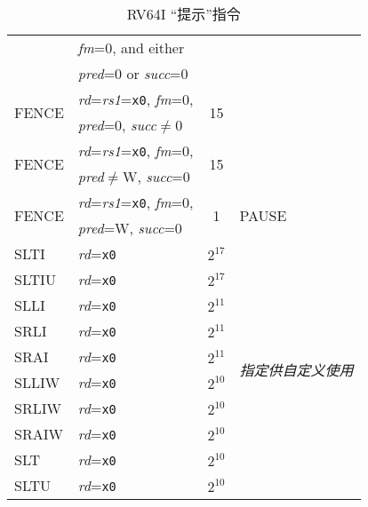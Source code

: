 \begin{table}[hbt]
\begin{tabular}{|l|l|c|l|}
                        & {\em fm}=0, and either                      &                             & \\
                        & {\em pred}=0 or {\em succ}=0                &                             & \\ \cline{1-3}
  \multirow{2}{*}{FENCE}& {\em rd}={\em rs1}={\tt x0}, {\em fm}=0,    & \multirow{2}{*}{15}         & \\
                        & {\em pred}=0, {\em succ}$\neq$0             &                             & \\ \cline{1-3}
  \multirow{2}{*}{FENCE}& {\em rd}={\em rs1}={\tt x0}, {\em fm}=0,    & \multirow{2}{*}{15}         & \\
                        & {\em pred}$\neq$W, {\em succ}=0             &                             & \\ \hline
  \multirow{2}{*}{FENCE}& {\em rd}={\em rs1}={\tt x0}, {\em fm}=0,    & \multirow{2}{*}{1}          & \multirow{2}{*}{PAUSE} \\
                        & {\em pred}=W, {\em succ}=0                  &                             & \\ \hline
  SLTI                  & {\em rd}={\tt x0}                           & $2^{17}$                    & \multirow{10}{*}{\em 指定供自定义使用} \\ \cline{1-3}
  SLTIU                 & {\em rd}={\tt x0}                           & $2^{17}$                    & \\ \cline{1-3}
  SLLI                  & {\em rd}={\tt x0}                           & $2^{11}$                    & \\ \cline{1-3}
  SRLI                  & {\em rd}={\tt x0}                           & $2^{11}$                    & \\ \cline{1-3}
  SRAI                  & {\em rd}={\tt x0}                           & $2^{11}$                    & \\ \cline{1-3}
  SLLIW                 & {\em rd}={\tt x0}                           & $2^{10}$                    & \\ \cline{1-3}
  SRLIW                 & {\em rd}={\tt x0}                           & $2^{10}$                    & \\ \cline{1-3}
  SRAIW                 & {\em rd}={\tt x0}                           & $2^{10}$                    & \\ \cline{1-3}
  SLT                   & {\em rd}={\tt x0}                           & $2^{10}$                    & \\ \cline{1-3}
  SLTU                  & {\em rd}={\tt x0}                           & $2^{10}$                    & \\ \hline
\end{tabular}
\caption{RV64I “提示”指令}
\label{tab:rv64i-hints}
\end{table}
